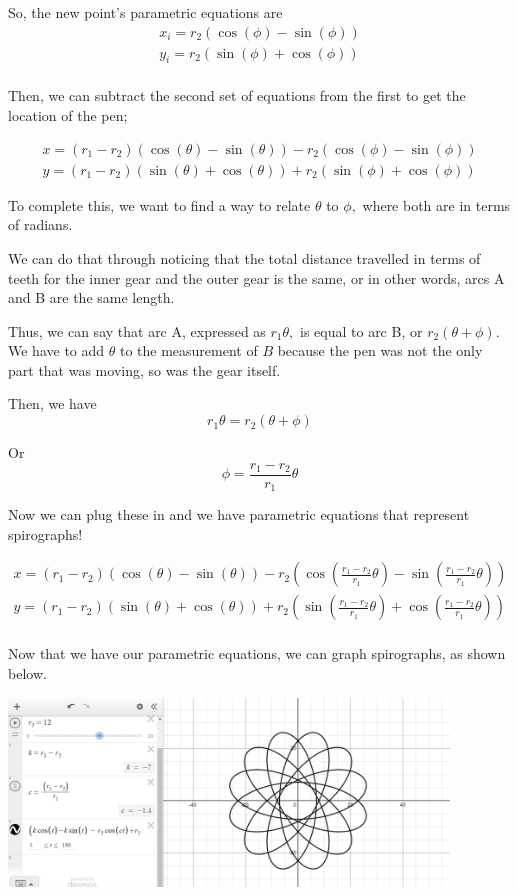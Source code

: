 \documentclass{article}
\theoremstyle{remark}
\theoremstyle{problem}
\numberwithin{problem}{subsection}
\numberwithin{Problem}{section}
\theoremstyle{definition}
\theoremstyle{definition}
\begin{document}
So, the new point's parametric equations are 
\begin{align*}
    x_i = r_2 \left( \cos(\phi) - \sin(\phi) \right) \\
    y_i = r_2  \left( \sin(\phi) + \cos(\phi) \right) \\
\end{align*}

Then, we can subtract the second set of equations from the first to get the location of the pen; 

\begin{align*}
    x = (r_1 - r_2) \left(\cos(\theta) - \sin(\theta) \right) - r_2  \left( \cos(\phi) - \sin(\phi) \right) \\
    y = (r_1 - r_2)(\sin(\theta) + \cos(\theta)) + r_2 (\sin(\phi) + \cos(\phi))
\end{align*}

To complete this, we want to find a way to relate $\theta$ to $\phi,$ where both are in terms of radians.

We can do that through noticing that the total distance travelled in terms of teeth for the inner gear and the outer gear is the same, or in other words, arcs A and B are the same length.

Thus, we can say that arc A, expressed as $r_1 \theta,$ is equal to arc B, or $r_2 (\theta + \phi).$ We have to add $\theta$ to the measurement of $B$ because the pen was not the only part that was moving, so was the gear itself. 

Then, we have $$r_1 \theta = r_2 (\theta + \phi)$$

Or $$ \phi = \frac{r_1 - r_2}{r_1}  \theta$$

Now we can plug these in and we have parametric equations that represent spirographs!

\begin{align*}
    x = (r_1 - r_2) (\cos(\theta) - \sin(\theta)) - r_2  \left( \cos\left(\frac{r_1 - r_2}{r_1}  \theta \right) - \sin\left(\frac{r_1 - r_2}{r_1}  \theta \right) \right) \\
    y = (r_1 - r_2) \left(\sin(\theta) + \cos(\theta) \right) + r_2 \left(\sin\left(\frac{r_1 - r_2}{r_1}  \theta \right) + \cos\left(\frac{r_1 - r_2}{r_1}  \theta \right) \right) \\
\end{align*}

Now that we have our parametric equations, we can graph spirographs, as shown below.

\begin{center}
\includegraphics[height=5cm]{images/Spirograph.png}
\end{center}
\end{document}
